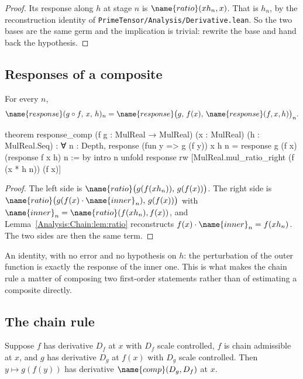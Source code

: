 \begin{proof}
Its response along $h$ at stage $n$ is $\name{ratio}(x h_n, x)$.  That is
$h_n$, by the reconstruction identity of
\texttt{PrimeTensor/Analysis/Derivative.lean}.
So the two bases are the same germ and the implication is trivial: rewrite the
base and hand back the hypothesis.
\end{proof}

\subsection{Responses of a composite}

\begin{lemma}\label{Analysis:Chain:lem:resp-comp}
For every $n$,
\[
  \name{response}(g \circ f,\, x,\, h)_n
    = \name{response}\bigl(g,\, f(x),\, \name{response}(f,x,h)\bigr)_n .
\]
\end{lemma}

\begin{leancode}
theorem response_comp
    (f g : MulReal → MulReal)
    (x : MulReal)
    (h : MulReal.Seq) :
    ∀ n : Depth,
      response (fun y => g (f y)) x h n =
        response g (f x) (response f x h) n := by
  intro n
  unfold response
  rw [MulReal.mul_ratio_right
    (f (x * h n))
    (f x)]
\end{leancode}

\begin{proof}
The left side is $\name{ratio}\bigl(g(f(x h_n)),\, g(f(x))\bigr)$.  The right
side is $\name{ratio}\bigl(g(f(x) \cdot \name{inner}_n),\, g(f(x))\bigr)$ with
$\name{inner}_n = \name{ratio}(f(x h_n), f(x))$, and
Lemma~\ref{Analysis:Chain:lem:ratio} reconstructs
$f(x) \cdot \name{inner}_n = f(x h_n)$.  The two sides are then the same term.
\end{proof}

An identity, with no error and no hypothesis on $h$: the perturbation of the
outer function is exactly the response of the inner one.  This is what makes
the chain rule a matter of composing two first-order statements rather than of
estimating a composite directly.

\subsection{The chain rule}

\begin{theorem}\label{Analysis:Chain:thm:chain}
Suppose $f$ has derivative $D_f$ at $x$ with $D_f$ scale controlled, $f$ is
chain admissible at $x$, and $g$ has derivative $D_g$ at $f(x)$ with $D_g$
scale controlled.  Then $y \mapsto g(f(y))$ has derivative
$\name{comp}(D_g, D_f)$ at $x$.
\end{theorem}

